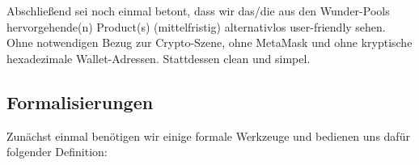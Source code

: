 \vspace{0.2cm}

Abschließend sei noch einmal betont, dass wir das/die aus den Wunder-Pools hervorgehende(n) Product(s) (mittelfristig) alternativlos user-friendly sehen. Ohne notwendigen Bezug zur Crypto-Szene, ohne MetaMask und ohne kryptische hexadezimale Wallet-Adressen. Stattdessen clean und simpel.

\vspace{0.5cm}

\subsection{Formalisierungen}

\vspace{0.3cm}

Zunächst einmal benötigen wir einige formale Werkzeuge und bedienen uns dafür folgender Definition:

\vspace{0.2cm}

